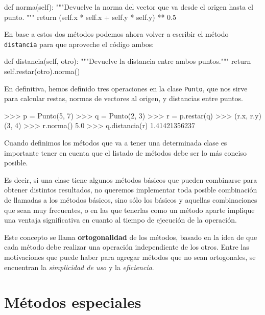 \begin{codigo-python-sn}
    def norma(self):
        """Devuelve la norma del vector que va desde el origen
           hasta el punto. """
        return (self.x * self.x + self.y * self.y) ** 0.5
\end{codigo-python-sn}

En base a estos dos métodos podemos ahora volver a escribir el método
\lstinline!distancia! para que aproveche el código ambos:

\begin{codigo-python-sn}
    def distancia(self, otro):
        """Devuelve la distancia entre ambos puntos."""
        return self.restar(otro).norma()
\end{codigo-python-sn}

En definitiva, hemos definido tres operaciones en la clase
\lstinline!Punto!, que nos sirve para calcular restas, normas de vectores
al origen, y distancias entre puntos.

\begin{codigo-python-sn}
>>> p = Punto(5, 7)
>>> q = Punto(2, 3)
>>> r = p.restar(q)
>>> (r.x, r.y)
(3, 4)
>>> r.norma()
5.0
>>> q.distancia(r)
1.41421356237
\end{codigo-python-sn}

\begin{atencion}
Cuando definimos los métodos que va a tener una determinada clase es
importante tener en cuenta que el listado de métodos debe ser lo más
conciso posible.

Es decir, si una clase tiene algunos métodos básicos que pueden combinarse
para obtener distintos resultados, no queremos implementar toda posible
combinación de llamadas a los métodos básicos, sino sólo los básicos y
aquellas combinaciones que sean muy frecuentes, o en las que
tenerlas como un método aparte implique una ventaja significativa en cuanto
al tiempo de ejecución de la operación.

Este concepto se llama {\bf ortogonalidad} de los métodos, basado en la
idea de que cada método debe realizar una operación independiente de los
otros.  Entre las motivaciones que puede haber para agregar métodos que no
sean ortogonales, se encuentran la {\it simplicidad de uso} y la {\it
eficiencia}.
\end{atencion}

\section{Métodos especiales}

